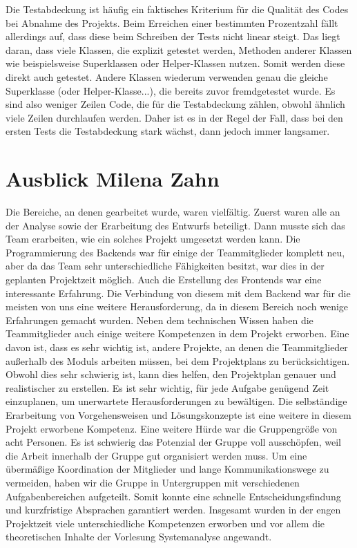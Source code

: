 	Die Testabdeckung ist häufig ein faktisches Kriterium für die Qualität des Codes bei Abnahme des Projekts. Beim Erreichen einer bestimmten Prozentzahl fällt allerdings auf, dass diese beim Schreiben der Tests nicht linear steigt. Das liegt daran, dass viele Klassen, die explizit getestet werden, Methoden anderer Klassen wie beispielsweise Superklassen oder Helper-Klassen nutzen. Somit werden diese direkt auch getestet. Andere Klassen wiederum verwenden genau die gleiche Superklasse (oder Helper-Klasse...), die bereits zuvor fremdgetestet wurde. Es sind also weniger Zeilen Code, die für die Testabdeckung zählen, obwohl ähnlich viele Zeilen durchlaufen werden. Daher ist es in der Regel der Fall, dass bei den ersten Tests die Testabdeckung stark wächst, dann jedoch immer langsamer.
	
	
	\section[Ausblick]{Ausblick {\hfill \normalsize Milena Zahn}}\label{Ausblick}
	Die Bereiche, an denen gearbeitet wurde, waren vielfältig. Zuerst waren alle an der Analyse sowie der Erarbeitung des Entwurfs beteiligt. Dann musste sich das Team erarbeiten, wie ein solches Projekt umgesetzt werden kann. Die Programmierung des Backends war für einige der Teammitglieder komplett neu, aber da das Team sehr unterschiedliche Fähigkeiten besitzt, war dies in der geplanten Projektzeit möglich. Auch die Erstellung des Frontends war eine interessante Erfahrung. Die Verbindung von diesem mit dem Backend war für die meisten von uns eine weitere Herausforderung, da in diesem Bereich noch wenige Erfahrungen gemacht wurden. 
	Neben dem technischen Wissen haben die Teammitglieder auch einige weitere Kompetenzen in dem Projekt erworben. Eine davon ist, dass es sehr wichtig ist, andere Projekte, an denen die Teammitglieder außerhalb des Moduls arbeiten müssen, bei dem Projektplans zu berücksichtigen. Obwohl dies sehr schwierig ist, kann dies helfen, den Projektplan genauer und realistischer zu erstellen. Es ist sehr wichtig, für jede Aufgabe genügend Zeit einzuplanen, um unerwartete Herausforderungen zu bewältigen. Die selbständige Erarbeitung von Vorgehensweisen und Lösungskonzepte ist eine weitere in diesem Projekt erworbene Kompetenz.
	Eine weitere Hürde war die Gruppengröße von acht Personen. Es ist schwierig das Potenzial der Gruppe voll ausschöpfen, weil die Arbeit innerhalb der Gruppe gut organisiert werden muss.  Um eine übermäßige Koordination der Mitglieder und lange Kommunikationswege zu vermeiden, haben wir die Gruppe in Untergruppen mit verschiedenen Aufgabenbereichen aufgeteilt. Somit konnte eine schnelle Entscheidungsfindung und kurzfristige Absprachen garantiert werden. Insgesamt wurden in der engen Projektzeit viele unterschiedliche Kompetenzen erworben und vor allem die theoretischen Inhalte der Vorlesung Systemanalyse angewandt.
	